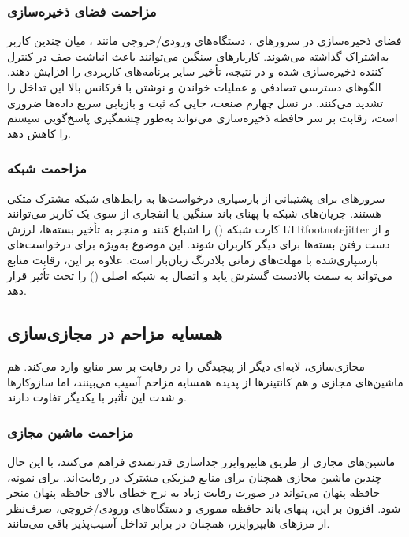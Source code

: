 \subsubsection{مزاحمت فضای ذخیره‌سازی}

فضای ذخیره‌سازی در سرورهای ، دستگاه‌های ورودی/خروجی مانند ، میان چندین کاربر به‌اشتراک گذاشته می‌شوند. کاربارهای سنگین  می‌توانند باعث انباشت صف در کنترل کننده ذخیره‌سازی شده و در نتیجه، تأخیر  سایر برنامه‌های کاربردی را افزایش دهند. الگوهای دسترسی تصادفی و عملیات خواندن و نوشتن با فرکانس بالا این تداخل را تشدید می‌کنند. در نسل چهارم صنعت، جایی که ثبت و بازیابی سریع داده‌ها ضروری است، رقابت بر سر حافظه ذخیره‌سازی می‌تواند به‌طور چشمگیری پاسخ‌گویی سیستم را کاهش دهد.

\subsubsection{مزاحمت شبکه}

سرورهای  برای پشتیبانی از بارسپاری درخواست‌ها به رابط‌های شبکه مشترک متکی هستند. جریان‌های شبکه با پهنای باند سنگین یا انفجاری از سوی یک کاربر می‌توانند کارت شبکه () را اشباع کنند و منجر به تأخیر بسته‌ها، لرزش LTRfootnote{jitter} و از دست رفتن بسته‌ها برای دیگر کاربران شوند. این موضوع به‌ویژه برای درخواست‌های بارسپاری‌شده با مهلت‌های زمانی بلادرنگ زیان‌بار است. علاوه بر این، رقابت منابع می‌تواند به سمت بالادست گسترش یابد و اتصال به شبکه اصلی () را تحت تأثیر قرار دهد.

\subsection{همسایه مزاحم در مجازی‌سازی}

مجازی‌سازی، لایه‌ای دیگر از پیچیدگی را در رقابت بر سر منابع وارد می‌کند. هم ماشین‌های مجازی و هم کانتینرها از پدیده همسایه مزاحم آسیب می‌بینند، اما سازوکارها و شدت این تأثیر با یکدیگر تفاوت دارند.

\subsubsection{مزاحمت ماشین مجازی}

ماشین‌های مجازی از طریق هایپروایزر جداسازی قدرتمندی فراهم می‌کنند، با این حال چندین ماشین مجازی همچنان برای منابع فیزیکی مشترک در رقابت‌اند. برای نمونه، حافظه پنهان  می‌تواند در صورت رقابت زیاد به نرخ خطای بالای حافظه پنهان منجر شود. افزون بر این، پنهای باند حافظه مموری و دستگاه‌های ورودی/خروجی، صرف‌نظر از مرزهای هایپروایزر، همچنان در برابر تداخل آسیب‌پذیر باقی می‌مانند.

